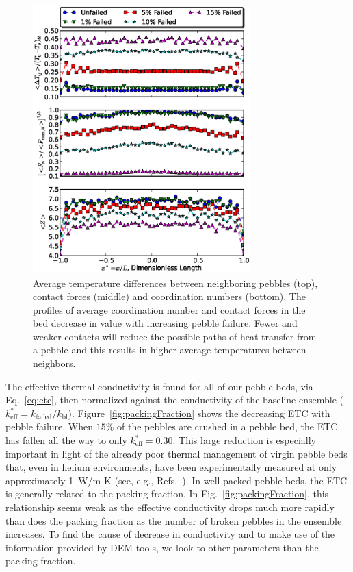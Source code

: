 \begin{figure}[htbp]
	\centering
	\includegraphics[width=0.75\textwidth]{chapters/figures/z_f_deltaT_subPlots}
	\caption{Average temperature differences between neighboring pebbles (top), contact forces (middle) and coordination numbers (bottom). The profiles of average coordination number and contact forces in the bed decrease in value with increasing pebble failure. Fewer and weaker contacts will reduce the possible paths of heat transfer from a pebble and this results in higher average temperatures between neighbors.}
\label{fig:coordProfiles}
\end{figure}


The effective thermal conductivity is found for all of our pebble beds, via Eq.~\ref{eq:etc}, then normalized against the conductivity of the baseline ensemble ($k_\text{eff}^* = k_\text{failed}/k_\text{bl}$). Figure~\ref{fig:packingFraction} shows the decreasing ETC with pebble failure. When $15\%$ of the pebbles are crushed in a pebble bed, the ETC has fallen all the way to only $k_\text{eff}^*=0.30$. This large reduction is especially important in light of the already poor thermal management of virgin pebble beds that, even in helium environments, have been experimentally measured at only approximately 1~W/m-K (see, { e.g.}, Refs.~\cite{Reimann:2002mi, Piazza2002}). In well-packed pebble beds, the ETC is generally related to the packing fraction. In Fig.~\ref{fig:packingFraction}, this relationship seems weak as the effective conductivity drops much more rapidly than does the packing fraction as the number of broken pebbles in the ensemble increases. To find the cause of decrease in conductivity and to make use of the information provided by DEM tools, we look to other parameters than the packing fraction.


